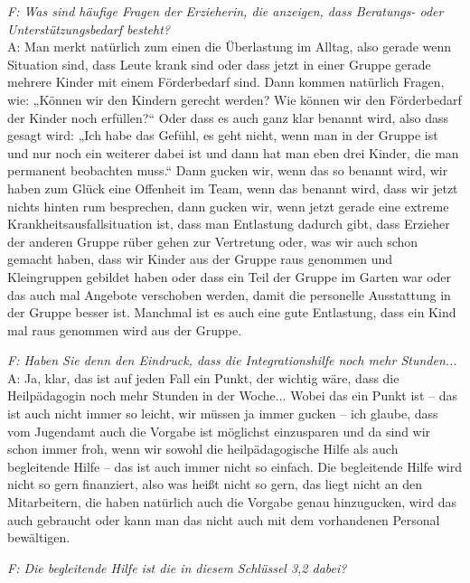 \begin{linenumbers*}
\emph{F: Was sind häufige Fragen der Erzieherin, die anzeigen, dass Beratungs- oder Unterstützungsbedarf besteht?}\\
A: Man merkt natürlich zum einen die Überlastung im Alltag, also gerade wenn Situation sind, dass Leute krank sind oder dass jetzt in einer Gruppe gerade mehrere Kinder mit einem Förderbedarf sind. Dann kommen natürlich Fragen, wie: „Können wir den Kindern gerecht werden? Wie können wir den Förderbedarf der Kinder noch erfüllen?“ Oder dass es auch ganz klar benannt wird, also dass gesagt wird: „Ich habe das Gefühl, es geht nicht, wenn man in der Gruppe ist und nur noch ein weiterer dabei ist und dann hat man eben drei Kinder, die man permanent beobachten muss.“ Dann gucken wir, wenn das so benannt wird, wir haben zum Glück eine Offenheit im Team, wenn das benannt wird, dass wir jetzt nichts hinten rum besprechen, dann gucken wir, wenn jetzt gerade eine extreme Krankheitsausfallsituation ist, dass man Entlastung dadurch gibt, dass Erzieher der anderen Gruppe rüber gehen zur Vertretung oder, was wir auch schon gemacht haben, dass wir Kinder aus der Gruppe raus genommen und Kleingruppen gebildet haben oder dass ein Teil der Gruppe im Garten war oder das auch mal Angebote verschoben werden, damit die personelle Ausstattung in der Gruppe besser ist. Manchmal ist es auch eine gute Entlastung, dass ein Kind mal raus genommen wird aus der Gruppe.  

\emph{F: Haben Sie denn den Eindruck, dass die Integrationshilfe noch mehr Stunden...}\\
A: Ja, klar, das ist auf jeden Fall ein Punkt, der wichtig wäre, dass die Heilpädagogin noch mehr Stunden in der Woche... Wobei das ein Punkt ist -- das ist auch nicht immer so leicht, wir müssen ja immer gucken -- ich glaube, dass vom Jugendamt auch die Vorgabe ist möglichst einzusparen und da sind wir schon immer froh, wenn wir sowohl die heilpädagogische Hilfe als auch begleitende Hilfe -- das ist auch immer nicht so einfach. Die begleitende Hilfe wird nicht so gern finanziert, also was heißt nicht so gern, das liegt nicht an den Mitarbeitern, die haben natürlich auch die Vorgabe genau hinzugucken, wird das auch gebraucht oder kann man das nicht auch mit dem vorhandenen Personal bewältigen. 

\emph{F: Die begleitende Hilfe ist die in diesem Schlüssel 3,2 dabei?} 


\end{linenumbers*}
